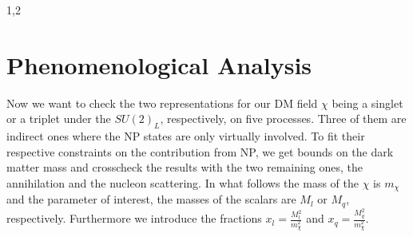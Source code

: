 \documentclass[11pt,a4paper,twoside]{article}
\numberwithin{equation}{section}
\begin{document}
\begin{spacing}{1,2}


\section{Phenomenological Analysis}
Now we want to check the two representations for our DM field $\chi$ being a singlet or a triplet under the $SU(2)_L$, respectively, on five processes. 
Three of them
are indirect ones where the NP states are only virtually involved. To fit their respective constraints on the contribution from NP, we get bounds on 
the dark matter mass and crosscheck the results with the two remaining ones, the annihilation and the nucleon scattering. In what follows the mass
of the $\chi$ is $m_\chi$ and the parameter of interest, the masses of the scalars are $M_l$ or $M_q$, respectively. Furthermore we introduce the fractions
$x_l=\frac{M^2_l}{m_\chi^2}$ and $x_q = \frac{M^2_q}{m_\chi^2}$. 













\end{spacing}
\end{document}
